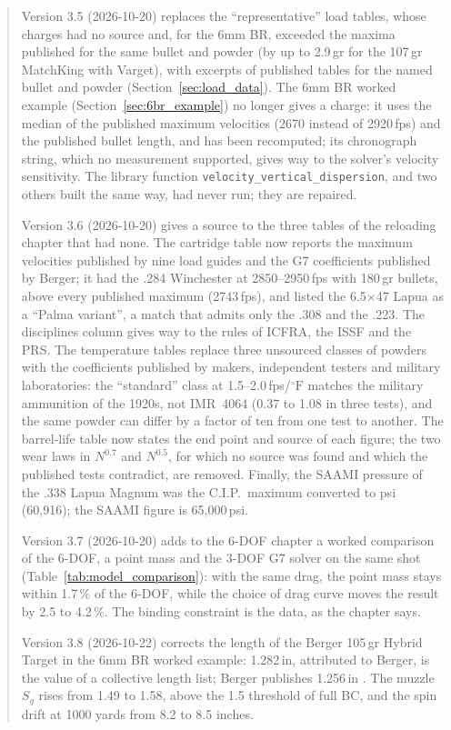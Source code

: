 \documentclass[11pt,twoside,openright]{report}
\newcommand{\degF}{\ensuremath{{}^{\circ}\mathrm{F}}}
\begin{document}
\begin{abstract}
Version 3.5 (2026-10-20) replaces the ``representative'' load tables, whose charges had no source and, for the 6mm BR, exceeded the maxima published for the same bullet and powder (by up to 2.9\,gr for the 107\,gr MatchKing with Varget), with excerpts of published tables for the named bullet and powder (Section~\ref{sec:load_data}). The 6mm BR worked example (Section~\ref{sec:6br_example}) no longer gives a charge: it uses the median of the published maximum velocities (2670 instead of 2920\,fps) and the published bullet length, and has been recomputed; its chronograph string, which no measurement supported, gives way to the solver's velocity sensitivity. The library function \texttt{velocity\_vertical\_dispersion}, and two others built the same way, had never run; they are repaired.

Version 3.6 (2026-10-20) gives a source to the three tables of the reloading chapter that had none. The cartridge table now reports the maximum velocities published by nine load guides and the G7 coefficients published by Berger; it had the .284 Winchester at 2850--2950\,fps with 180\,gr bullets, above every published maximum (2743\,fps), and listed the 6.5$\times$47 Lapua as a ``Palma variant'', a match that admits only the .308 and the .223. The disciplines column gives way to the rules of ICFRA, the ISSF and the PRS. The temperature tables replace three unsourced classes of powders with the coefficients published by makers, independent testers and military laboratories: the ``standard'' class at 1.5--2.0\,fps/$\degF$ matches the military ammunition of the 1920s, not IMR~4064 (0.37 to 1.08 in three tests), and the same powder can differ by a factor of ten from one test to another. The barrel-life table now states the end point and source of each figure; the two wear laws in $N^{0.7}$ and $N^{0.5}$, for which no source was found and which the published tests contradict, are removed. Finally, the SAAMI pressure of the .338 Lapua Magnum was the C.I.P.\ maximum converted to psi (60{,}916); the SAAMI figure is 65{,}000\,psi.

Version 3.7 (2026-10-20) adds to the 6-DOF chapter a worked comparison of the 6-DOF, a point mass and the 3-DOF G7 solver on the same shot (Table~\ref{tab:model_comparison}): with the same drag, the point mass stays within 1.7\,\% of the 6-DOF, while the choice of drag curve moves the result by 2.5 to 4.2\,\%. The binding constraint is the data, as the chapter says.

Version 3.8 (2026-10-22) corrects the length of the Berger 105\,gr Hybrid Target in the 6mm BR worked example: 1.282\,in, attributed to Berger, is the value of a collective length list; Berger publishes 1.256\,in \citep{berger_charts}. The muzzle $S_g$ rises from 1.49 to 1.58, above the 1.5 threshold of full BC, and the spin drift at 1000 yards from 8.2 to 8.5 inches.
\end{abstract}
\end{document}
